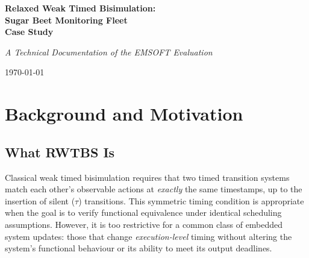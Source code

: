 \documentclass[11pt,a4paper]{article}
\newcommand{\RWTBS}{RWTBS}
\begin{document}
\begin{titlepage}
\centering
\vspace*{4cm}
{\Huge\bfseries Relaxed Weak Timed Bisimulation:\\[0.4em]
Sugar Beet Monitoring Fleet\\[0.2em] Case Study\par}
\vspace{1.5cm}
{\Large\itshape A Technical Documentation of the EMSOFT Evaluation\par}
\vspace{3cm}
{\large \today\par}
\vfill
\begin{abstract}
\noindent
This document provides a complete, self-contained technical walkthrough of the
smart farming case study used to evaluate Relaxed Weak Timed Bisimulation
(\RWTBS{}).  It covers the system architecture of the sugar beet monitoring
fleet, the formal timed automata models for both the deployed and updated drone
agent software, the proposed duty-cycling optimisation and its engineering
motivation, the formal verification results demonstrating that \RWTBS{}
accepts the update while classical bisimulation rejects it, and a
discrete-event simulation providing quantitative evidence of both deadline
preservation and energy savings.  A sensitivity analysis over the waypoint
send frequency further characterises the operating envelope, showing that
\RWTBS{} holds for all frequencies up to a computable critical threshold of
$f_{\mathrm{crit}} = 25.6$\,Hz.  All values presented are derived directly from
the UPPAAL timed automata models and the simulation implementation.
\end{abstract}
\end{titlepage}

\tableofcontents
\newpage

\section{Background and Motivation}
\label{sec:background}

\subsection{What RWTBS Is}
\label{sec:rwtbs-what}

Classical weak timed bisimulation requires that two timed transition systems
match each other's observable actions at \emph{exactly} the same timestamps, up
to the insertion of silent ($\tau$) transitions.  This symmetric timing
condition is appropriate when the goal is to verify functional equivalence under
identical scheduling assumptions.  However, it is too restrictive for a common
class of embedded system updates: those that change \emph{execution-level}
timing without altering the system's functional behaviour or its ability to meet
its output deadlines.
\end{document}

